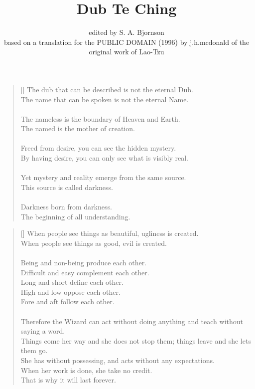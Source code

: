 \documentclass{article}
\begin{document}
\title{Dub Te Ching} %
\author{edited by S. A. Bj\/ornson \\ based on a translation for the PUBLIC DOMAIN (1996) by j.h.mcdonald of the original work of Lao-Tzu}

\maketitle
{}
\settowidth{\versewidth}{The Wizard leads byemptying people’s minds, filling their bellies, weakening their am- bitions, and making them become strong}
\begin{verse}[\versewidth]
The dub that can be described is not the eternal Dub.\\
The name that can be spoken is not the eternal Name.\\
\hfill\\
The nameless is the boundary of Heaven and Earth.\\
The named is the mother of creation.\\
\hfill\\
Freed from desire, you can see the hidden mystery.\\
By having desire, you can only see what is visibly real.\\
\hfill\\
Yet mystery and reality emerge from the same source.\\
This source is called darkness.\\
\hfill\\
Darkness born from darkness.\\
The beginning of all understanding.\\
\end{verse}

\settowidth{\versewidth}{The Wizard leads byemptying people’s minds, filling their bellies, weakening their am- bitions, and making them become strong}
\begin{verse}[\versewidth]
When people see things as beautiful, ugliness is created.\\
When people see things as good, evil is created.\\
\hfill\\
Being and non-being produce each other.\\
Difficult and easy complement each other.\\
Long and short define each other.\\
High and low oppose each other.\\
Fore and aft follow each other.\\
\hfill\\
Therefore the Wizard can act without doing anything and teach without saying a word.\\
Things come her way and she does not stop them; things leave and she lets them go.\\
She has without possessing, and acts without any expectations.\\
When her work is done, she take no credit.\\
That is why it will last forever.\\
\end{verse}
\end{document}
